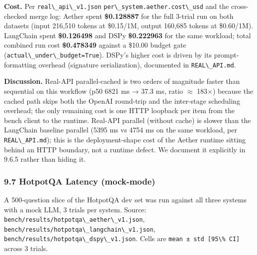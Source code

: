 \documentclass[
]{article}
\newcommand{\passthrough}[1]{#1}
\begin{document}
\textbf{Cost.} Per \passthrough{\lstinline!real\_api\_v1.json!}
\passthrough{\lstinline!per\_system.aether.cost\_usd!} and the
cross-checked merge log: Aether spent \textbf{\$0.128887} for the full
3-trial run on both datasets (input 216,510 tokens at \$0.15/1M, output
160,685 tokens at \$0.60/1M). LangChain spent \textbf{\$0.126498} and
DSPy \textbf{\$0.222963} for the same workload; total combined run cost
\textbf{\$0.478349} against a \$10.00 budget gate
(\passthrough{\lstinline!actual\_under\_budget=True!}). DSPy's higher
cost is driven by its prompt-formatting overhead (signature
serialization), documented in \passthrough{\lstinline!REAL\_API.md!}.

\textbf{Discussion.} Real-API parallel-cached is two orders of magnitude
faster than sequential on this workflow (p50 6821 ms → 37.3 ms, ratio
\(\approx\) 183×) because the cached path skips both the OpenAI
round-trip and the inter-stage scheduling overhead; the only remaining
cost is one HTTP loopback per item from the bench client to the runtime.
Real-API parallel (without cache) is slower than the LangChain baseline
parallel (5395 ms vs 4754 ms on the same workload, per
\passthrough{\lstinline!REAL\_API.md!}); this is the deployment-shape
cost of the Aether runtime sitting behind an HTTP boundary, not a
runtime defect. We document it explicitly in 9.6.5 rather than hiding
it.

\subsubsection{9.7 HotpotQA Latency
(mock-mode)}\label{hotpotqa-latency-mock-mode}

A 500-question slice of the HotpotQA dev set was run against all three
systems with a mock LLM, 3 trials per system. Source:
\passthrough{\lstinline!bench/results/hotpotqa\_aether\_v1.json!},
\passthrough{\lstinline!bench/results/hotpotqa\_langchain\_v1.json!},
\passthrough{\lstinline!bench/results/hotpotqa\_dspy\_v1.json!}. Cells
are \passthrough{\lstinline!mean ± std [95\% CI]!} across 3 trials.
\end{document}
